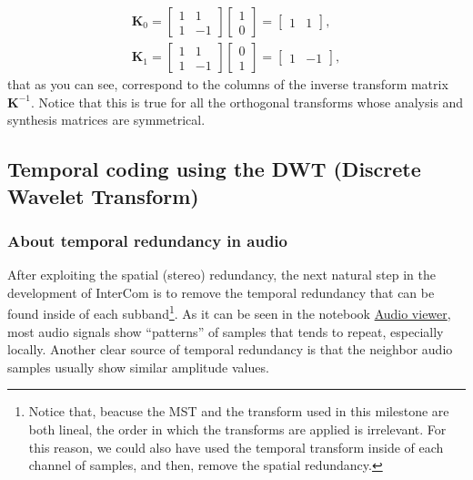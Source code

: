 \begin{equation}
  \begin{array}{l}
    {\mathbf K}_0 =
    \begin{bmatrix}
      1 & 1 \\
      1 & -1
    \end{bmatrix}
          \begin{bmatrix}
            1 \\
            0
          \end{bmatrix}
    =
    \begin{bmatrix}
      1 & 1
    \end{bmatrix},
    \\
    {\mathbf K}_1 = 
    \begin{bmatrix}
      1 & 1 \\
      1 & -1
    \end{bmatrix}
          \begin{bmatrix}
            0 \\
            1
          \end{bmatrix}
    =
    \begin{bmatrix}
      1 & -1
    \end{bmatrix},
  \end{array}
\end{equation}
that as you can see, correspond to the columns of the inverse
transform matrix ${\mathbf K}^{-1}$. Notice that this is true for all
the orthogonal transforms whose analysis and synthesis matrices are
symmetrical.%


\subsection{Temporal coding using the DWT (Discrete Wavelet Transform)}

\subsubsection{About temporal redundancy in audio}

After exploiting the spatial (stereo) redundancy, the next natural
step in the development of InterCom is to remove the temporal
redundancy that can be found inside of each subband\footnote{Notice
that, beacuse the MST and the transform used in this milestone are
both lineal, the order in which the transforms are applied is
irrelevant. For this reason, we could also have used the temporal
transform inside of each channel of samples, and then, remove the
spatial redundancy.}. As it can be seen in the notebook
\href{https://github.com/Tecnologias-multimedia/intercom/blob/master/tools/audio_viewer.ipynb}{Audio viewer},
most audio signals show ``patterns'' of samples that tends to repeat,
especially locally. Another clear source of temporal redundancy is
that the neighbor audio samples usually show similar amplitude values.


